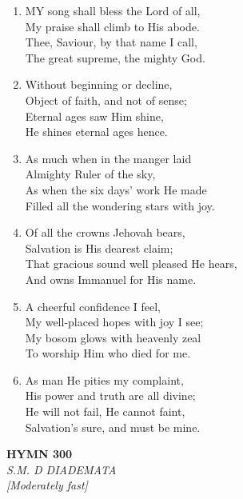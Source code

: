 \begin{enumerate}
    \item MY song shall bless the Lord of all, \\
        My praise shall climb to His abode. \\
        Thee, Saviour, by that name I call, \\
        The great supreme, the mighty God.

    \item Without beginning or decline, \\
        Object of faith, and not of sense; \\
        Eternal ages saw Him shine, \\
        He shines eternal ages hence.

    \item As much when in the manger laid \\
        Almighty Ruler of the sky, \\
        As when the six days' work He made \\
        Filled all the wondering stars with joy.

    \item Of all the crowns Jehovah bears, \\
        Salvation is His dearest claim; \\
        That gracious sound well pleased He hears, \\
        And owns Immanuel for His name.

    \item A cheerful confidence I feel, \\
        My well-placed hopes with joy I see; \\
        My bosom glows with heavenly zeal \\
        To worship Him who died for me.

    \item As man He pities my complaint, \\
        His power and truth are all divine; \\
        He will not fail, He cannot faint, \\
        Salvation's sure, and must be mine.

\end{enumerate}

\newpage
\begin{center}
    {\Large \textbf{HYMN 300}}
    \\
    \textit{S.M. D DIADEMATA}
    \\
    \textit{\small [Moderately fast]}
\end{center}
\vspace{1em}

